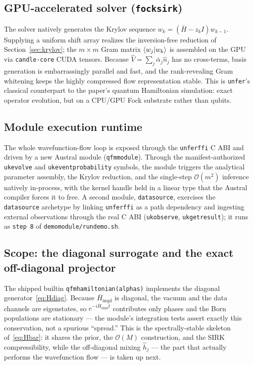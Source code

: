 \documentclass[11pt, a4paper]{article}
\begin{document}
\subsection{GPU-accelerated solver (\texttt{fock\textunderscore sirk})}

The solver natively generates the Krylov sequence $w_k=(\bar H-z_kI)w_{k-1}$.
Supplying a uniform shift array realizes the inversion-free reduction of
Section~\ref{sec:krylov}; the $m\times m$ Gram matrix $\braket{w_j|w_k}$ is
assembled on the GPU via \texttt{candle-core} CUDA tensors. Because
$\hat V=\sum_j\bar\alpha_j\hat n_j$ has no cross-terms, basis generation is
embarrassingly parallel and fast, and the rank-revealing Gram whitening keeps
the highly compressed flow representation stable. This is \texttt{unfer}'s
classical counterpart to the paper's quantum Hamiltonian simulation: exact
operator evolution, but on a CPU/GPU Fock substrate rather than qubits.

\subsection{Module execution runtime}

The whole wavefunction-flow loop is exposed through the
\texttt{unfer\textunderscore ffi} C ABI and driven by a new Austral module
(\texttt{qfm\textunderscore module}). Through the manifest-authorized
\texttt{uk\textunderscore evolve} and
\texttt{uk\textunderscore event\textunderscore probability} symbols, the module
triggers the analytical parameter assembly, the Krylov reduction, and the
single-step $\mathcal{O}(m^2)$ inference natively in-process, with the kernel
handle held in a linear type that the Austral compiler forces it to free. A
second module, \texttt{data\textunderscore source}, exercises the
\texttt{data\textunderscore source} archetype by linking
\texttt{unfer\textunderscore ffi} as a path dependency and ingesting
external observations through the real C ABI (\texttt{uk\textunderscore observe},
\texttt{uk\textunderscore get\textunderscore result}); it runs as
\texttt{step~8} of \texttt{demo\textunderscore module/run\textunderscore demo.sh}.

\subsection{Scope: the diagonal surrogate and the exact off-diagonal projector}

The shipped builtin \texttt{qfm\textunderscore hamiltonian(alphas)} implements
the diagonal generator~\eqref{eq:Hdiag}. Because $\bar H_{\text{impl}}$ is
diagonal, the vacuum and the data channels are eigenstates, so
$e^{-i\bar H_{\text{impl}}t}$ contributes only phases and the Born populations
are stationary --- the module's integration tests assert exactly this
conservation, not a spurious ``spread.'' This is the spectrally-stable
skeleton of~\eqref{eq:Hbar}: it shares the prior, the $\mathcal{O}(M)$
construction, and the SIRK compressibility, while the off-diagonal mixing
$\hat h_j$ --- the part that actually performs the wavefunction flow --- is
taken up next.
\end{document}
